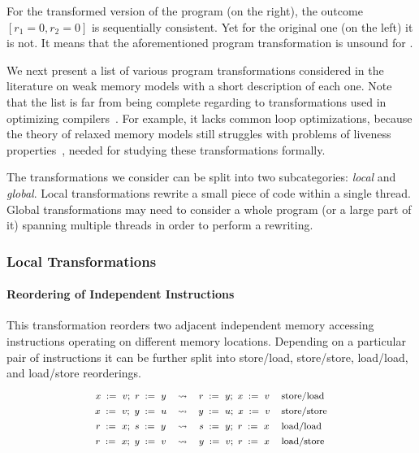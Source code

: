 For the transformed version of the program (on the right),
the outcome $[r_1=0, r_2=0]$ is sequentially consistent.
Yet for the original one (on the left) it is not. 
It means that the aforementioned program transformation
is unsound for \SC. 

We next present a list of 
various program transformations considered in
the literature on weak memory models 
with a short description of each one.
Note that the list is far from being complete regarding to  
transformations used in optimizing compilers~\cite{Muchnick:ACDI97}.
For example, it lacks common loop optimizations, 
because the theory of relaxed memory models still
struggles with problems of liveness properties~\cite{Lahav-al:arXiv20}, 
needed for studying these transformations formally. 

The transformations we consider can be split into 
two subcategories: \emph{local} and \emph{global}.
Local transformations rewrite a small 
piece of code within a single thread.
Global transformations may need to consider 
a whole program (or a large part of it) 
spanning multiple threads in order 
to perform a rewriting.       
 
\subsubsection{Local Transformations}

\paragraph{Reordering of Independent Instructions} 

This transformation reorders two 
adjacent independent memory accessing instructions
operating on different memory locations.
Depending on a particular pair of instructions
it can be further split into store/load, store/store, 
load/load, and load/store reorderings.  
%
\[\def\arraystretch{1.4}\footnotesize
  \begin{array}{cccl} 

      \writeInst{}{x}{v} \seq \readInst{}{r}{y} 
    & \leadsto 
    & \readInst{}{r}{y} \seq \writeInst{}{x}{v}
    & \text{store/load}  \\ 

      \writeInst{}{x}{v} \seq \writeInst{}{y}{u} 
    & \leadsto 
    & \writeInst{}{y}{u} \seq \writeInst{}{x}{v}
    & \text{store/store}  \\ 

      \readInst{}{r}{x} \seq \readInst{}{s}{y} 
    & \leadsto 
    & \readInst{}{s}{y} \seq \readInst{}{r}{x}
    & \text{load/load}  \\ 

      \readInst{}{r}{x} \seq \writeInst{}{y}{v} 
    & \leadsto 
    & \writeInst{}{y}{v} \seq \readInst{}{r}{x}
    & \text{load/store}  \\ 

  \end{array}
\]

